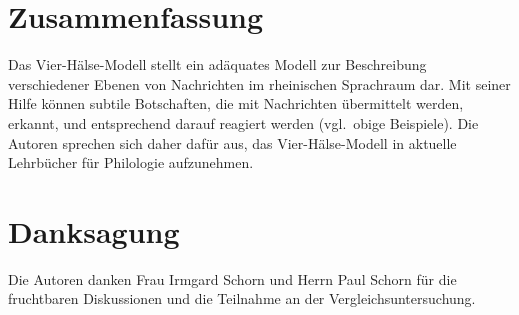 \documentclass[11pt,DIV16,twocolumn]{scrartcl}
\begin{document}
\section{Zusammenfassung}

Das Vier-Hälse-Modell stellt ein adäquates Modell zur Beschreibung
verschiedener Ebenen von Nachrichten im rheinischen Sprachraum dar.
Mit seiner Hilfe können subtile Botschaften, die mit Nachrichten
übermittelt werden, erkannt, und entsprechend darauf reagiert werden
(vgl.\ obige Beispiele).  Die Autoren sprechen sich daher dafür aus,
das Vier-Hälse-Modell in aktuelle Lehrbücher für Philologie
aufzunehmen.

\section*{Danksagung}

Die Autoren danken Frau Irmgard Schorn und Herrn Paul Schorn für die
fruchtbaren Diskussionen und die Teilnahme an der
Vergleichsuntersuchung.



\end{document}
